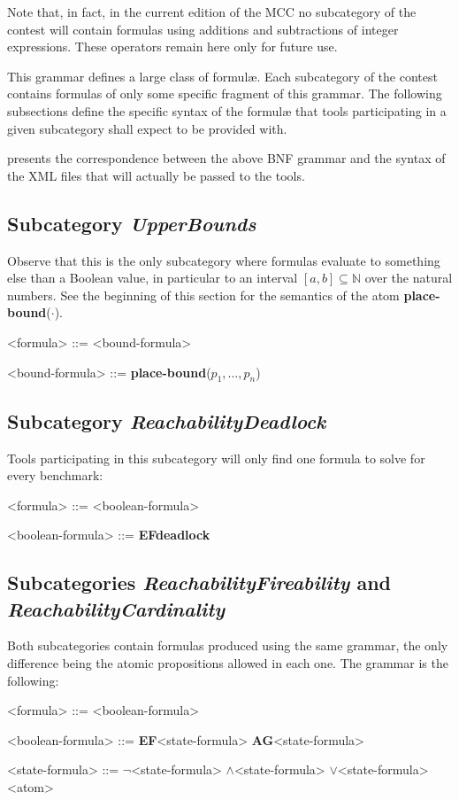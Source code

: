 \documentclass[10pt,english,a4paper]{article}
\newcommand\N                {\mathbb{N}}
\newcommand\ctla             {\textbf{A}\xspace}
\newcommand\ctle             {\textbf{E}\xspace}
\newcommand\ltlf             {\textbf{F}\xspace}
\newcommand\ltlg             {\textbf{G}\xspace}
\newcommand\logicnot         {\boldmath$\lnot$\xspace}
\newcommand\logicand         {\boldmath$\land$\xspace}
\newcommand\logicor          {\boldmath$\lor$\xspace}
\newcommand\atomdead         {\textbf{deadlock}\xspace}
\newcommand\atomplacebnd[1]  {\textbf{place-bound}(#1)}
\newcommand{\mcc}[0]{MCC}
\newcommand\mysubsection[1]{\color{sectioncolor}\subsection{#1}\color{defaultcolor}}
\begin{document}
Note that, in fact, in the current edition of the \mcc{} no subcategory of the
contest will contain formulas using additions and subtractions of integer
expressions. These operators remain here only for future use.


This grammar defines a large class of formulæ.
Each subcategory of the contest contains formulas of only some specific
fragment of this grammar.
The following subsections define the specific syntax of the formul\ae{}
that tools participating in a given subcategory shall expect to be provided
with.

 presents the correspondence between the above BNF grammar
and the syntax of the XML files that will actually be passed to the tools.

\mysubsection{Subcategory \textit{UpperBounds}}

Observe that this is the only subcategory where formulas evaluate to something
else than a Boolean value, in particular to an interval $[a, b] \subseteq \N$
over the natural numbers. See the beginning of this section for the semantics
of the atom \atomplacebnd{$\cdot$}.

\begin{grammar}
<formula> ::= <bound-formula>

<bound-formula> ::= \atomplacebnd{$p_1, \ldots, p_n$}
\end{grammar}


\mysubsection{Subcategory \textit{ReachabilityDeadlock}}

Tools participating in this subcategory will only find one formula to solve
for every benchmark:

\begin{grammar}

<formula> ::= <boolean-formula>

<boolean-formula> ::= \ctle \ltlf \atomdead

\end{grammar}

\mysubsection{Subcategories \textit{ReachabilityFireability} and \textit{ReachabilityCardinality}}

Both subcategories contain formulas produced using the same grammar, the
only difference being the atomic propositions allowed in each one.
The grammar is the following:

\begin{grammar}
<formula> ::= <boolean-formula>

<boolean-formula> ::= \ctle \ltlf <state-formula>
\alt \ctla \ltlg <state-formula>

<state-formula> ::=  \logicnot  <state-formula>
 \logicand <state-formula>
 \logicor  <state-formula>
\alt <atom>
\end{grammar}
\end{document}

